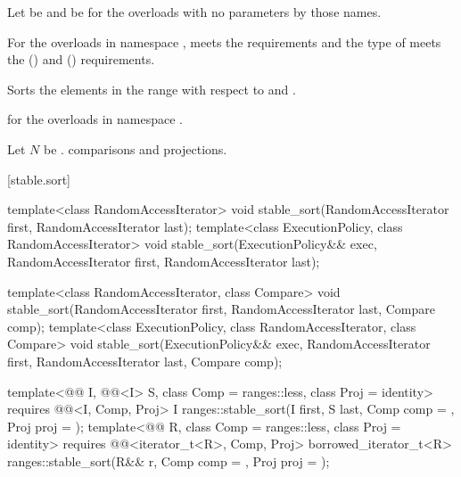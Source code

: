 \begin{itemdescr}
\pnum
Let  be 
and  be 
for the overloads with no parameters by those names.

\pnum
\expects
For the overloads in namespace ,
 meets
the  requirements and
the type of  meets
the  () and
 () requirements.

\pnum
\effects
Sorts the elements in the range 
with respect to  and .

\pnum
\returns
{} for the overloads in namespace .

\pnum
\complexity
Let $N$ be .
 comparisons and projections.
\end{itemdescr}

[stable.sort]{}

%
\begin{itemdecl}
template<class RandomAccessIterator>
  void stable_sort(RandomAccessIterator first, RandomAccessIterator last);
template<class ExecutionPolicy, class RandomAccessIterator>
  void stable_sort(ExecutionPolicy&& exec,
                   RandomAccessIterator first, RandomAccessIterator last);

template<class RandomAccessIterator, class Compare>
  void stable_sort(RandomAccessIterator first, RandomAccessIterator last,
                   Compare comp);
template<class ExecutionPolicy, class RandomAccessIterator, class Compare>
  void stable_sort(ExecutionPolicy&& exec,
                   RandomAccessIterator first, RandomAccessIterator last,
                   Compare comp);

template<@@ I, @@<I> S, class Comp = ranges::less,
         class Proj = identity>
  requires @@<I, Comp, Proj>
  I ranges::stable_sort(I first, S last, Comp comp = {}, Proj proj = {});
template<@@ R, class Comp = ranges::less, class Proj = identity>
  requires @@<iterator_t<R>, Comp, Proj>
  borrowed_iterator_t<R>
    ranges::stable_sort(R&& r, Comp comp = {}, Proj proj = {});
\end{itemdecl}

